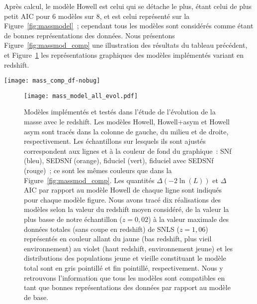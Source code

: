 \documentclass[../main/main.tex]{subfiles}
\begin{document}
Après calcul, le modèle Howell est celui qui se détache le plus, étant celui de
plus petit AIC pour 6 modèles sur 8, et est celui représenté sur la
Figure~\ref{fig:massmodel}~; cependant tous les modèles sont considérés comme
étant de bonnes représentations des données. Nous présentons
Figure~\ref{fig:massmod_comp} une illustration des résultats du tableau
précédent, et Figure~\ref{fig:massmod_all} les représentations graphiques des
modèles implémentés variant en redshift.

\begin{SCfigure}[1][h!]
    \centering
    \texttt{[image: mass\_comp\_df-nobug]}
    \caption[$\Delta$AIC entre le modèle Howell et les autres
    modèles]{$\Delta$AIC entre le modèle Howell et les autres modèles (voir
        Tableau~\ref{tab:modelcomp}). Tous les modèles sont dérivants. Les
        marqueurs bleus, orange, verts, rouges montrent les résultats lorsque
        l'analyse est effectuée sur l'échantillon SNf, SEDSNf, fiduciel,
        fiduciel avec SEDSNf, respectivement (voir légende). Les bandes de
        couleur illustrent la validité des modèles, d'acceptable ($\Delta$AIC >
        -5) à exclu ($\Delta$AIC < -20). En suivant ces valeurs d'AIC, tous les
        modèles sont compatibles entre eux.}
    \label{fig:massmod_comp}
\end{SCfigure}

\begin{figure}[htbp]
    \vspace*{-3cm}
    \centerfloat
    \texttt{[image: mass\_model\_all\_evol.pdf]}
    \caption[Modèles implémentés et testés dans l'étude de l'évolution de
    l'étirement avec le redshift]{\scriptsize Modèles implémentés et testés dans
        l'étude de l'évolution de la masse avec le redshift. Les modèles Howell,
        Howell+asym et Howell asym sont tracés dans la colonne de gauche, du
        milieu et de droite, respectivement. Les échantillons sur lesquels ils
        sont ajustés correspondent aux lignes et à la couleur de fond du
        graphique~: SNf (bleu), SEDSNf (orange), fiduciel (vert), fiduciel avec
        SEDSNf (rouge)~; ce sont les mêmes couleurs que dans la
        Figure~\ref{fig:massmod_comp}. Les quantités $\Delta(-2\ln(L))$ et
        $\Delta$AIC par rapport au modèle Howell de chaque ligne sont indiqués
        pour chaque modèle figure. Nous avons tracé dix réalisations des modèles
        selon la valeur du redshift moyen considéré, de la valeur la plus basse
        de notre échantillon ($z = 0,02$) à la valeur maximale des données
        totales (sans coupe en redshift) de SNLS ($z = 1,06$) représentés en
        couleur allant du jaune (bas redshift, plus vieil environnement) au
        violet (haut redshift, environnement jeune) et les distributions des
        populations jeune et vieille constituant le modèle total sont en gris
        pointillé et fin pointillé, respectivement. Nous y retrouvons
        l'information que tous les modèles sont compatibles en tant que bonnes
    représentations des données par rapport au modèle de base.}
    \label{fig:massmod_all}
\end{figure}
\end{document}

